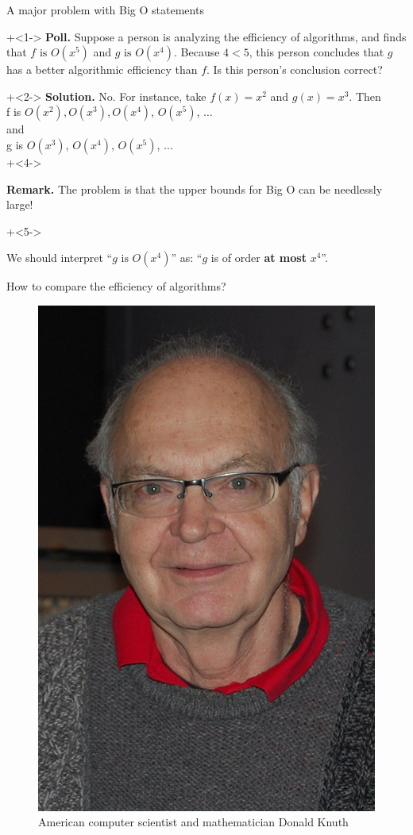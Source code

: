 \documentclass[10pt]{beamer}
\begin{document}
\begin{frame}{A major problem with Big O statements}

\onslide+<1->
\colorbox{yellow!30}{\textbf{Poll.}} Suppose a person is analyzing the efficiency of algorithms, and finds that $f \text{ is } O(x^5)$ and $g \text{ is } O(x^4)$.  Because $4<5$, this person concludes that $g$ has a better algorithmic efficiency than $f$. Is this person's conclusion correct?
\vfill 

\onslide+<2->
\colorbox{green!30}{\textbf{Solution.}} No.  For instance, take $f(x) = x^2$ and $g(x)=x^3$. Then \\
\qquad \alert<3->{f}  \; is \; $O(x^2), O(x^3), O(x^4)$, \alert<3->{$O(x^5)$}, $\hdots$   \\ 
and  \\
\qquad \alert<3->{g}  \; is \;  $O(x^3)$, \alert<3->{$O(x^4)$}, $O(x^5)$, $\hdots$  \\
\vfill 
\onslide+<4->

\colorbox{red!30}{\textbf{Remark.}} The problem is that the upper bounds for Big O can be needlessly large! 

\vfill 
\onslide+<5->
 
We should interpret \enquote{$g \text{ is } O(x^4)$} as: \enquote{$g$ is of order \textbf{at most} $x^4$}.

\end{frame}


\begin{frame}{How to compare the efficiency of algorithms?}
\begin{figure}
\includegraphics[width=.4\textwidth]{images/donald_knuth}
\caption{American computer scientist and mathematician Donald Knuth}

\pause 
    
\end{figure}
\end{frame}
\end{document}
